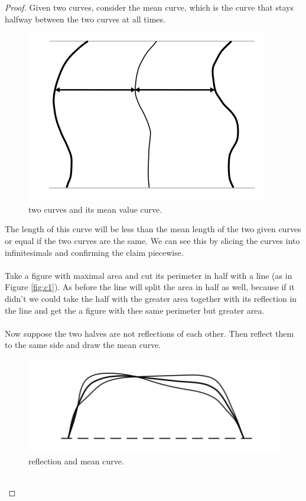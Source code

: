 \documentclass[12pt, a4paper, titlepage]{article}
\begin{document}
\begin{proof}
Given two curves, consider the mean curve, which is the curve that stays halfway between the two curves at all times. \\
\begin{figure}[htbp]
\includegraphics[scale=0.5]{images/Figure4}
\centering
\caption{two curves and its mean value curve.}
\end{figure}
\newpage
The length of this curve will be less than the mean length of the two given curves or equal if the two curves are the same. We can see this by slicing the curves into infinitesimals and confirming the claim piecewise.\\\\
Take a figure with maximal area and cut its perimeter in half with a line (as in Figure \ref{fig:c1}).
As before the line will split the area in half as well, because if it didn't we could take the half with the greater area together with its reflection in the line and get the a figure with thee same perimeter but greater area.\\
\\
Now suppose the two halves are not reflections of each other. Then reflect them to the same side and draw the mean curve.
\begin{figure}[htbp]
\includegraphics[scale=0.5]{images/Figure5}
\centering
\caption{reflection and mean curve.}
\end{figure} \\

\end{proof}
\end{document}
